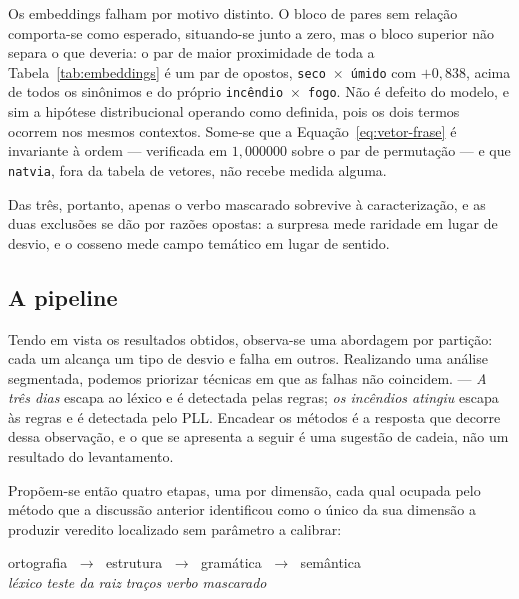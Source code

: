 Os embeddings falham por motivo distinto. O bloco de pares sem relação comporta-se como
esperado, situando-se junto a zero, mas o bloco superior não separa o que deveria: o par de
maior proximidade de toda a Tabela~\ref{tab:embeddings} é um par de opostos,
\texttt{seco}~×~\texttt{úmido} com $+0{,}838$, acima de todos os sinônimos e do próprio
\texttt{incêndio}~×~\texttt{fogo}. Não é defeito do modelo, e sim a hipótese distribucional
operando como definida, pois os dois termos ocorrem nos mesmos contextos. Some-se que a
Equação~\ref{eq:vetor-frase} é invariante à ordem --- verificada em $1{,}000000$ sobre o par
de permutação --- e que \texttt{natvia}, fora da tabela de vetores, não recebe medida alguma.

Das três, portanto, apenas o verbo mascarado sobrevive à caracterização, e as duas exclusões se
dão por razões opostas: a surpresa mede raridade em lugar de desvio, e o cosseno mede campo
temático em lugar de sentido.



\subsection{A pipeline}
\label{disc:pipeline}

\indent\indent Tendo em vista os resultados obtidos, 
observa-se uma abordagem por partição: cada um alcança um tipo 
de desvio e falha em outros. Realizando uma análise segmentada, 
podemos priorizar técnicas em que as falhas não coincidem. 
--- \emph{A três dias} escapa ao léxico e é detectada pelas regras; \emph{os
incêndios atingiu} escapa às regras e é detectada pelo PLL. Encadear os métodos é a resposta
que decorre dessa observação, e o que se apresenta a seguir é uma sugestão de cadeia, não um
resultado do levantamento.

Propõem-se então quatro etapas, uma por dimensão, cada qual ocupada pelo método que a discussão
anterior identificou como o único da sua dimensão a produzir veredito localizado sem parâmetro
a calibrar:

\begin{center}
\small
ortografia $\;\rightarrow\;$ estrutura $\;\rightarrow\;$ gramática $\;\rightarrow\;$ semântica \\[2pt]
\emph{léxico} \qquad \emph{teste da raiz} \qquad \emph{traços} \qquad \emph{verbo mascarado}
\end{center}

